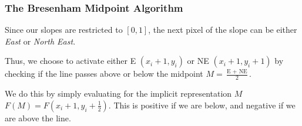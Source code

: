 \documentclass{panikzettel}
\begin{document}
\begin{halfboxl}
\vspace{-\baselineskip}
\subsubsection*{The Bresenham Midpoint Algorithm}



\begin{minipage}{0.77\textwidth}
Since our slopes are restricted to $[0,1]$, the next pixel of the slope can be either \emph{East} or \emph{North East}.
\end{minipage}%
\begin{minipage}{0.03\textwidth}
\begin{center}

\end{center}
\end{minipage}%
\begin{minipage}{0.2\textwidth}
\begin{center}
\end{center}
\end{minipage}

Thus, we choose to activate either E $(x_i + 1, y_i)$ or NE $(x_i + 1, y_i + 1)$ by checking if the line passes above or below the midpoint $M = \frac{\text{E } + \text{ NE}}{2}$.

We do this by simply evaluating for the implicit representation $M$ $F(M) = F(x_i + 1, y_i + \frac{1}{2})$. This is positive if we are below, and negative if we are above the line.


\end{halfboxl}%
\end{document}
